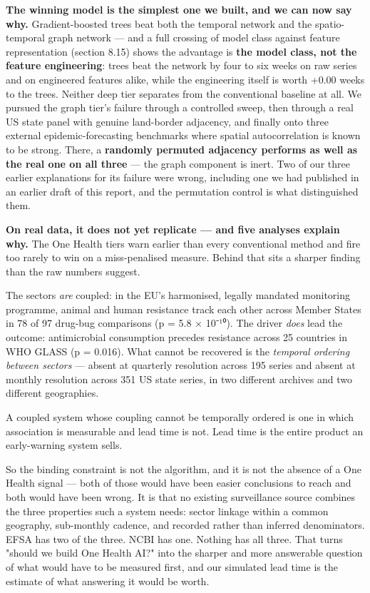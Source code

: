 \documentclass[11pt,a4paper]{article}
\begin{document}
\textbf{The winning model is the simplest one we built, and we can now say why.} Gradient-boosted trees beat both the temporal network and the spatio-temporal graph network — and a full crossing of model class against feature representation (section 8.15) shows the advantage is \textbf{the model class, not the feature engineering}: trees beat the network by four to six weeks on raw series and on engineered features alike, while the engineering itself is worth +0.00 weeks to the trees. Neither deep tier separates from the conventional baseline at all. We pursued the graph tier's failure through a controlled sweep, then through a real US state panel with genuine land-border adjacency, and finally onto three external epidemic-forecasting benchmarks where spatial autocorrelation is known to be strong. There, a \textbf{randomly permuted adjacency performs as well as the real one on all three} — the graph component is inert. Two of our three earlier explanations for its failure were wrong, including one we had published in an earlier draft of this report, and the permutation control is what distinguished them.

\textbf{On real data, it does not yet replicate — and five analyses explain why.} The One Health tiers warn earlier than every conventional method and fire too rarely to win on a miss-penalised measure. Behind that sits a sharper finding than the raw numbers suggest.

The sectors \emph{are} coupled: in the EU's harmonised, legally mandated monitoring programme, animal and human resistance track each other across Member States in 78 of 97 drug-bug comparisons (p = 5.8 × 10⁻¹⁰). The driver \emph{does} lead the outcome: antimicrobial consumption precedes resistance across 25 countries in WHO GLASS (p = 0.016). What cannot be recovered is the \emph{temporal ordering between sectors} — absent at quarterly resolution across 195 series and absent at monthly resolution across 351 US state series, in two different archives and two different geographies.

A coupled system whose coupling cannot be temporally ordered is one in which association is measurable and lead time is not. Lead time is the entire product an early-warning system sells.

So the binding constraint is not the algorithm, and it is not the absence of a One Health signal — both of those would have been easier conclusions to reach and both would have been wrong. It is that no existing surveillance source combines the three properties such a system needs: sector linkage within a common geography, sub-monthly cadence, and recorded rather than inferred denominators. EFSA has two of the three. NCBI has one. Nothing has all three. That turns "should we build One Health AI?" into the sharper and more answerable question of what would have to be measured first, and our simulated lead time is the estimate of what answering it would be worth.
\end{document}
